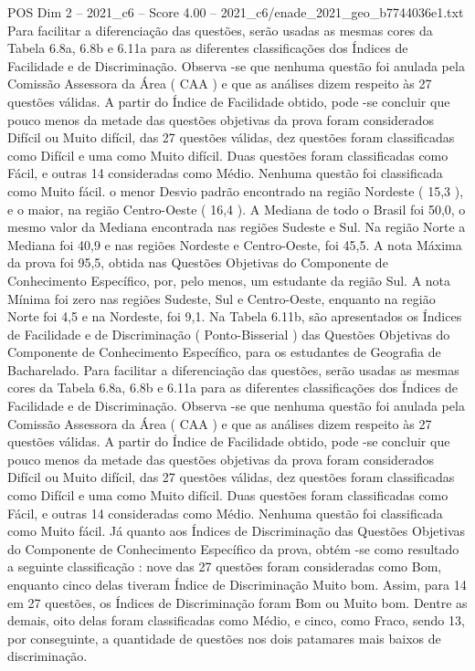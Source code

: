 \begin{textsample}{POS Dim 2 – 2021\_c6 – Score 4.00 – 2021\_c6/enade\_2021\_geo\_b7744036e1.txt}
Para facilitar a diferenciação das questões, serão usadas as mesmas cores da Tabela 6.8a, 6.8b e 6.11a para as diferentes classificações dos Índices de Facilidade e de Discriminação.
Observa -se que nenhuma questão foi anulada pela Comissão Assessora da Área ( CAA ) e que as análises dizem respeito às 27 questões válidas.
A partir do Índice de Facilidade obtido, pode -se concluir que pouco menos da metade das questões objetivas da prova foram considerados Difícil ou Muito difícil, das 27 questões válidas, dez questões foram classificadas como Difícil e uma como Muito difícil.
Duas questões foram classificadas como Fácil, e outras 14 consideradas como Médio.
Nenhuma questão foi classificada como Muito fácil. o menor Desvio padrão encontrado na região Nordeste ( 15,3 ), e o maior, na região Centro-Oeste ( 16,4 ).
A Mediana de todo o Brasil foi 50,0, o mesmo valor da Mediana encontrada nas regiões Sudeste e Sul.
Na região Norte a Mediana foi 40,9 e nas regiões Nordeste e Centro-Oeste, foi 45,5.
A nota Máxima da prova foi 95,5, obtida nas Questões Objetivas do Componente de Conhecimento Específico, por, pelo menos, um estudante da região Sul.
A nota Mínima foi zero nas regiões Sudeste, Sul e Centro-Oeste, enquanto na região Norte foi 4,5 e na Nordeste, foi 9,1.
Na Tabela 6.11b, são apresentados os Índices de Facilidade e de Discriminação ( Ponto-Bisserial ) das Questões Objetivas do Componente de Conhecimento Específico, para os estudantes de Geografia de Bacharelado.
Para facilitar a diferenciação das questões, serão usadas as mesmas cores da Tabela 6.8a, 6.8b e 6.11a para as diferentes classificações dos Índices de Facilidade e de Discriminação.
Observa -se que nenhuma questão foi anulada pela Comissão Assessora da Área ( CAA ) e que as análises dizem respeito às 27 questões válidas.
A partir do Índice de Facilidade obtido, pode -se concluir que pouco menos da metade das questões objetivas da prova foram considerados Difícil ou Muito difícil, das 27 questões válidas, dez questões foram classificadas como Difícil e uma como Muito difícil.
Duas questões foram classificadas como Fácil, e outras 14 consideradas como Médio.
Nenhuma questão foi classificada como Muito fácil.
Já quanto aos Índices de Discriminação das Questões Objetivas do Componente de Conhecimento Específico da prova, obtém -se como resultado a seguinte classificação : nove das 27 questões foram consideradas como Bom, enquanto cinco delas tiveram Índice de Discriminação Muito bom.
Assim, para 14 em 27 questões, os Índices de Discriminação foram Bom ou Muito bom.
Dentre as demais, oito delas foram classificadas como Médio, e cinco, como Fraco, sendo 13, por conseguinte, a quantidade de questões nos dois patamares mais baixos de discriminação.

\end{textsample}
